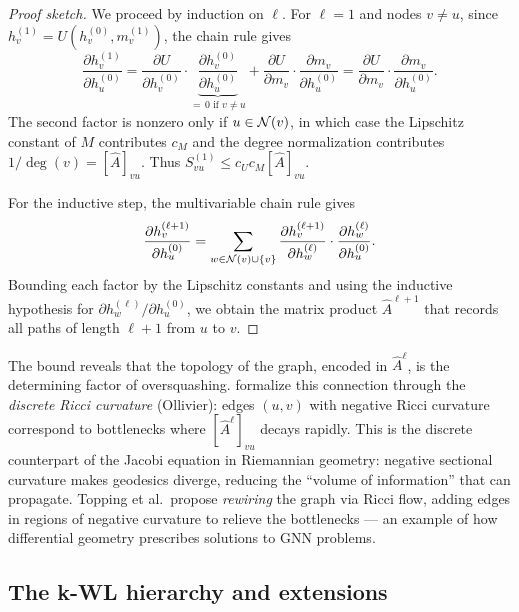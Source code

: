 \begin{proof}[Proof sketch]
We proceed by induction on $\ell$. For $\ell = 1$ and nodes $v \neq u$, since
$h_v^{(1)} = U(h_v^{(0)}, m_v^{(1)})$, the chain rule gives
\[
  \frac{\partial h_v^{(1)}}{\partial h_u^{(0)}}
    = \frac{\partial U}{\partial h_v^{(0)}}
      \cdot \underbrace{\frac{\partial h_v^{(0)}}{\partial h_u^{(0)}}}_{=\,0 \text{ if } v \neq u}
    + \frac{\partial U}{\partial m_v} \cdot \frac{\partial m_v}{\partial h_u^{(0)}}
    = \frac{\partial U}{\partial m_v} \cdot \frac{\partial m_v}{\partial h_u^{(0)}}.
\]
The second factor is nonzero only if $u \in \mathcal{N}(v)$, in which case the Lipschitz
constant of $M$ contributes $c_M$ and the degree normalization contributes
$1/\deg(v) = [\hat A]_{vu}$. Thus $S_{vu}^{(1)} \le c_U c_M [\hat A]_{vu}$.

For the inductive step, the multivariable chain rule gives
\[
  \frac{\partial h_v^{(\ell+1)}}{\partial h_u^{(0)}}
    = \sum_{w \in \mathcal{N}(v) \cup \{v\}}
      \frac{\partial h_v^{(\ell+1)}}{\partial h_w^{(\ell)}}
      \cdot \frac{\partial h_w^{(\ell)}}{\partial h_u^{(0)}}.
\]
Bounding each factor by the Lipschitz constants and using the inductive
hypothesis for $\partial h_w^{(\ell)} / \partial h_u^{(0)}$, we obtain the matrix
product $\hat A^{\ell+1}$ that records all paths of length $\ell + 1$ from $u$ to
$v$. \qedhere
\end{proof}

\begin{remark}
\label{rem:priors:curvature}
The bound reveals that the topology of the graph, encoded in $\hat A^\ell$, is
the determining factor of oversquashing. \citet{topping2022understanding}
formalize this connection through the \emph{discrete Ricci curvature} (Ollivier):
edges $(u, v)$ with negative Ricci curvature correspond to bottlenecks where
$[\hat A^\ell]_{vu}$ decays rapidly. This is the discrete counterpart of the
Jacobi equation in Riemannian geometry: negative sectional curvature makes
geodesics diverge, reducing the ``volume of information'' that can propagate.
Topping et al.\ propose \emph{rewiring} the graph via Ricci flow, adding edges in
regions of negative curvature to relieve the bottlenecks --- an example of how
differential geometry prescribes solutions to GNN problems.
\end{remark}

\subsection{The k-WL hierarchy and extensions}
\label{sec:priors:kwl}

